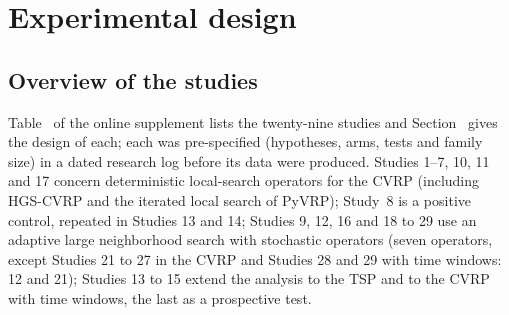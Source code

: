 \section{Experimental design}\label{sec:design}

\subsection{Overview of the studies}\label{sec:overview}
Table~ of the online supplement lists the twenty-nine studies and Section~ gives the design of each; each was pre-specified (hypotheses, arms, tests and family size) in a dated research log before its data were produced. Studies 1--7, 10, 11 and 17 concern deterministic local-search operators for the CVRP (including HGS-CVRP and the iterated local search of PyVRP); Study~8 is a positive control, repeated in Studies 13 and 14; Studies 9, 12, 16 and 18 to 29 use an adaptive large neighborhood search with stochastic operators (seven operators, except Studies 21 to 27 in the CVRP and Studies 28 and 29 with time windows: 12 and 21); Studies 13 to 15 extend the analysis to the TSP and to the CVRP with time windows, the last as a prospective test.

